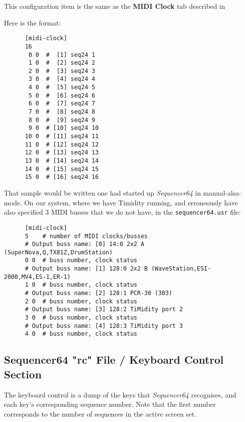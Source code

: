    This configuration item is the same as the 
   \textbf{MIDI Clock} tab described in
   
   Here is the format:

   \begin{verbatim}
      [midi-clock]
      16
       0 0  #  [1] seq24 1
       1 0  #  [2] seq24 2
       2 0  #  [3] seq24 3
       3 0  #  [4] seq24 4
       4 0  #  [5] seq24 5
       5 0  #  [6] seq24 6
       6 0  #  [7] seq24 7
       7 0  #  [8] seq24 8
       8 0  #  [9] seq24 9
       9 0  # [10] seq24 10
      10 0  # [11] seq24 11
      11 0  # [12] seq24 12
      12 0  # [13] seq24 13
      13 0  # [14] seq24 14
      14 0  # [15] seq24 15
      15 0  # [16] seq24 16
   \end{verbatim}

   That sample would be written one had started up \textsl{Sequencer64} in
   manual-alsa-mode.  On our system, where we have Timidity running, and
   erroneously have also specified 3 MIDI busses that we do not have, in the
   \texttt{sequencer64.usr} file:

   \begin{verbatim}
      [midi-clock]
      5    # number of MIDI clocks/busses
      # Output buss name: [0] 14:0 2x2 A (SuperNova,Q,TX81Z,DrumStation)
      0 0  # buss number, clock status
      # Output buss name: [1] 128:0 2x2 B (WaveStation,ESI-2000,MV4,ES-1,ER-1)
      1 0  # buss number, clock status
      # Output buss name: [2] 128:1 PCR-30 (303)
      2 0  # buss number, clock status
      # Output buss name: [3] 128:2 TiMidity port 2
      3 0  # buss number, clock status
      # Output buss name: [4] 128:3 TiMidity port 3
      4 0  # buss number, clock status
   \end{verbatim}

\subsection{Sequencer64 "rc" File / Keyboard Control Section}
\label{subsec:seq64_rc_file_keyboard_control}
        
   The keyboard control is a dump of the keys that \textsl{Sequencer64}
   recognises, and each key's corresponding sequence number.
   Note that the first number corresponds to the number of sequences in
   the active screen set.

